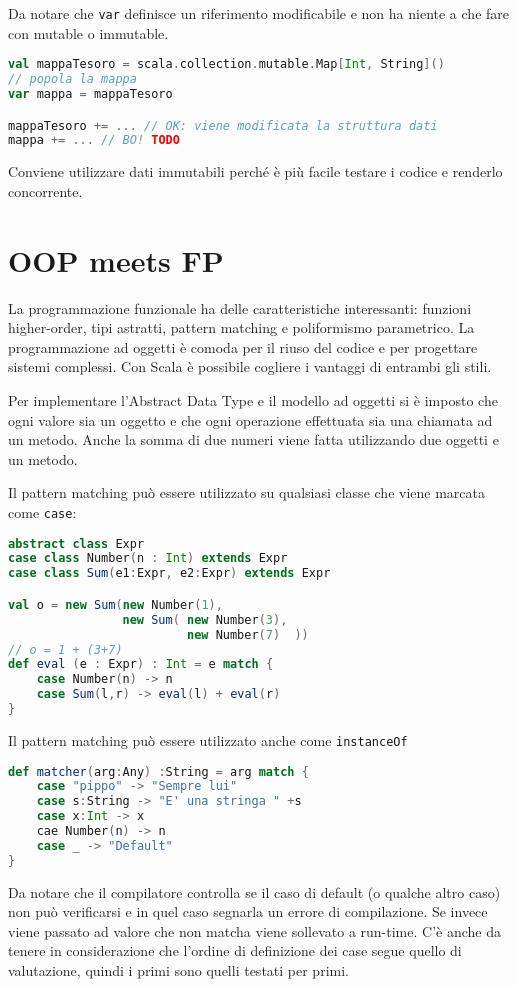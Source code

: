 Da notare che \texttt{var} definisce un riferimento modificabile e non ha niente a che fare con mutable o immutable.

\begin{lstlisting}[language=Scala]
val mappaTesoro = scala.collection.mutable.Map[Int, String]()
// popola la mappa
var mappa = mappaTesoro

mappaTesoro += ... // OK: viene modificata la struttura dati
mappa += ... // BO! TODO
\end{lstlisting}

Conviene utilizzare dati immutabili perché è più facile testare i codice e renderlo concorrente.

\section{OOP meets FP}

La programmazione funzionale ha delle caratteristiche interessanti: funzioni higher-order, tipi astratti, pattern matching e poliformismo parametrico.
La programmazione ad oggetti è comoda per il riuso del codice e per progettare sistemi complessi.
Con Scala è possibile cogliere i vantaggi di entrambi gli stili.

Per implementare l'Abstract Data Type e il modello ad oggetti si è imposto che ogni valore sia un oggetto e che ogni operazione effettuata sia una chiamata ad un metodo. Anche la somma di due numeri viene fatta utilizzando due oggetti e un metodo.

Il pattern matching può essere utilizzato su qualsiasi classe che viene marcata come \texttt{case}:

\begin{lstlisting}[language=Scala]
abstract class Expr
case class Number(n : Int) extends Expr
case class Sum(e1:Expr, e2:Expr) extends Expr

val o = new Sum(new Number(1),
                new Sum( new Number(3),
                         new Number(7)  )) 
// o = 1 + (3+7)
def eval (e : Expr) : Int = e match {
	case Number(n) -> n
	case Sum(l,r) -> eval(l) + eval(r)
}
\end{lstlisting}

Il pattern matching può essere utilizzato anche come \texttt{instanceOf}

\begin{lstlisting}[language=Scala]
def matcher(arg:Any) :String = arg match {
	case "pippo" -> "Sempre lui"
	case s:String -> "E' una stringa " +s
	case x:Int -> x
	cae Number(n) -> n
	case _ -> "Default"
}
\end{lstlisting}

Da notare che il compilatore controlla se il caso di default (o qualche altro caso) non può verificarsi e in quel caso segnarla un errore di compilazione. Se invece viene passato ad valore che non matcha viene sollevato a run-time.
C'è anche da tenere in considerazione che l'ordine di definizione dei case segue quello di valutazione, quindi i primi sono quelli testati per primi.\\







